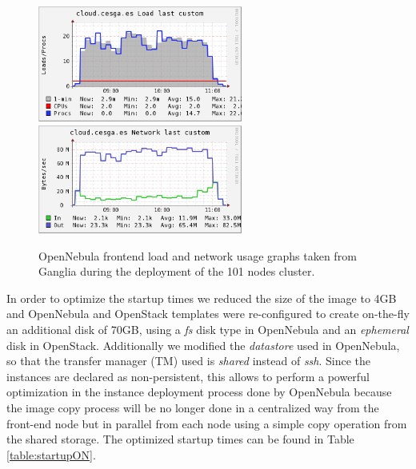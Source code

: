 \begin{figure}[t!]
\centering
\includegraphics[width=0.6\textwidth]{figures/ON_load-complete.png}
\includegraphics[width=0.6\textwidth]{figures/ON_network-complete.png}
\caption{OpenNebula frontend load and network usage graphs taken from Ganglia during the deployment of the 101 nodes cluster.}
\label{fig:on}
\end{figure}


In order to optimize the startup times we reduced the size of the image to 4GB and OpenNebula and OpenStack templates were re-configured to create on-the-fly an additional disk of 70GB, using a \emph{fs} disk type in OpenNebula and an \emph{ephemeral} disk in OpenStack. Additionally we modified the \emph{datastore} used in OpenNebula, so that the transfer manager (TM) used is \emph{shared} instead of \emph{ssh}. Since the instances are declared as non-persistent, this allows to perform a powerful optimization in the instance deployment process done by OpenNebula because the image copy process will be no longer done in a centralized way from the front-end node but in parallel from each node using a simple copy operation from the shared storage. The optimized startup times can be found in Table \ref{table:startupON}.


